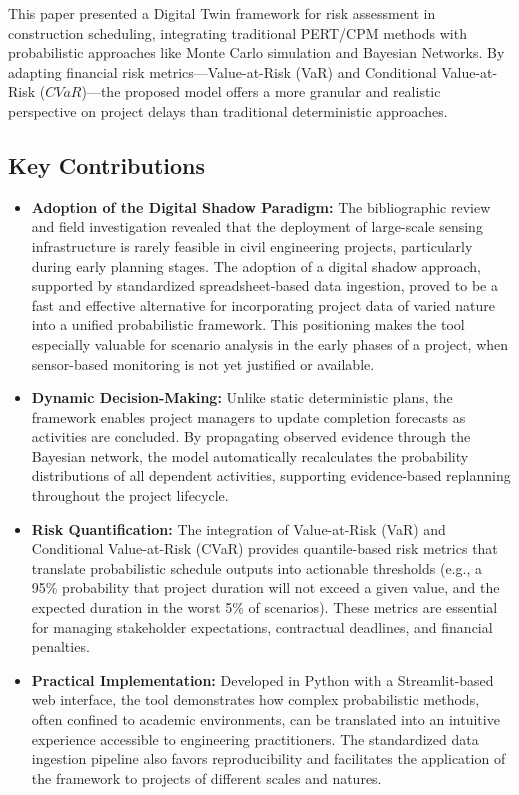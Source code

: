This paper presented a Digital Twin framework for risk assessment in construction scheduling, integrating traditional PERT/CPM methods with probabilistic approaches like Monte Carlo simulation and Bayesian Networks. By adapting financial risk metrics—Value-at-Risk (VaR) and Conditional Value-at-Risk ($CVaR$)—the proposed model offers a more granular and realistic perspective on project delays than traditional deterministic approaches.

\subsection{Key Contributions}
\begin{itemize}
    \item \textbf{Adoption of the Digital Shadow Paradigm:} The bibliographic review and field investigation revealed that the deployment of large-scale sensing infrastructure is rarely feasible in civil engineering projects, particularly during early planning stages. The adoption of a digital shadow approach, supported by standardized spreadsheet-based data ingestion, proved to be a fast and effective alternative for incorporating project data of varied nature into a unified probabilistic framework. This positioning makes the tool especially valuable for scenario analysis in the early phases of a project, when sensor-based monitoring is not yet justified or available.
    \item \textbf{Dynamic Decision-Making:} Unlike static deterministic plans, the framework enables project managers to update completion forecasts as activities are concluded. By propagating observed evidence through the Bayesian network, the model automatically recalculates the probability distributions of all dependent activities, supporting evidence-based replanning throughout the project lifecycle.
    \item \textbf{Risk Quantification:} The integration of Value-at-Risk (VaR) and Conditional Value-at-Risk (CVaR) provides quantile-based risk metrics that translate probabilistic schedule outputs into actionable thresholds (e.g., a 95\% probability that project duration will not exceed a given value, and the expected duration in the worst 5\% of scenarios). These metrics are essential for managing stakeholder expectations, contractual deadlines, and financial penalties.
    \item \textbf{Practical Implementation:} Developed in Python with a Streamlit-based web interface, the tool demonstrates how complex probabilistic methods, often confined to academic environments, can be translated into an intuitive experience accessible to engineering practitioners. The standardized data ingestion pipeline also favors reproducibility and facilitates the application of the framework to projects of different scales and natures.
\end{itemize}

